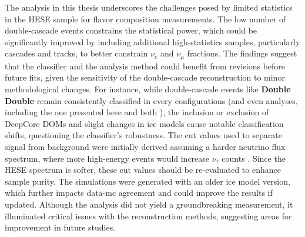 The analysis in this thesis underscores the challenges posed by limited statistics in the HESE sample for flavor composition measurements. The low number of double-cascade events constrains the statistical power, which could be significantly improved by including additional high-statistics samples, particularly cascades and tracks, to better constrain $\nu_e$ and $\nu_\mu$ fractions. The findings suggest that the classifier and the analysis method could benefit from revisions before future fits, given the sensitivity of the double-cascade reconstruction to minor methodological changes. For instance, while double-cascade events like \textbf{Double Double} remain consistently classified in every configurations (and even analyses, including the one presented here and both  ), the inclusion or exclusion of DeepCore DOMs and slight changes in ice models cause notable classification shifts, questioning the classifier's robustness. The cut values used to separate signal from background were initially derived assuming a harder neutrino flux spectrum, where more high-energy events would increase $\nu_\tau$ counts . Since the HESE spectrum is softer, these cut values should be re-evaluated to enhance sample purity. The simulations were generated with an older ice model version, which further impacts data-mc agreement and could improve the results if updated. Although the analysis did not yield a groundbreaking measurement, it illuminated critical issues with the reconstruction methods, suggesting areas for improvement in future studies. 

